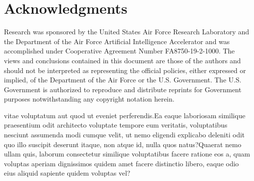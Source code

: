 \documentclass[letterpaper]{article} %
\begin{document}
\section*{Acknowledgments}

Research was sponsored by the United States Air Force Research Laboratory and the Department of the Air Force Artificial Intelligence Accelerator and was accomplished under Cooperative Agreement Number FA8750-19-2-1000. The views and conclusions contained in this document are those of the authors and should not be interpreted as representing the official policies, either expressed or implied, of the Department of the Air Force or the U.S. Government. The U.S. Government is authorized to reproduce and distribute reprints for Government purposes notwithstanding any copyright notation herein.



 vitae voluptatum aut quod ut eveniet perferendis.Ea eaque laboriosam similique praesentium odit architecto voluptate tempore eum veritatis, voluptatibus nesciunt assumenda modi cumque velit, ut nemo eligendi explicabo deleniti odit quo illo suscipit deserunt itaque, non atque id, nulla quos natus?Quaerat nemo ullam quis, laborum consectetur similique voluptatibus facere ratione eos a, quam voluptas aperiam dignissimos quidem amet facere distinctio libero, eaque odio eius aliquid sapiente quidem voluptas vel?\clearpage

\end{document}
